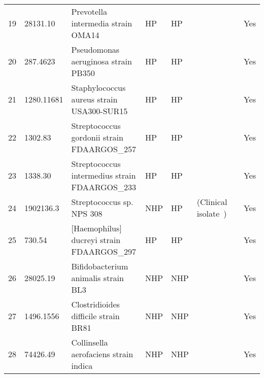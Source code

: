 \begin{tabular}{llllllll}
19  &    28131.10 &                                Prevotella intermedia strain OMA14 &            HP &              HP &                                      \cite{naito2016complete} &  \cite{santos2012differentially} &           Yes \\
20  &    287.4623 &                               Pseudomonas aeruginosa strain PB350 &            HP &              HP &                                    \cite{huang2020integrated} &         \cite{diggle2020microbe} &           Yes \\
21  &  1280.11681 &                         Staphylococcus aureus strain USA300-SUR15 &            HP &              HP &                                      \cite{sabat2017complete} &                 \cite{o2017into} &           Yes \\
22  &     1302.83 &                       Streptococcus gordonii strain FDAARGOS\_257 &            HP &              HP &                                                \cite{1302.83} &     \cite{park2020streptococcus} &           Yes \\
23  &     1338.30 &                    Streptococcus intermedius strain FDAARGOS\_233 &            HP &              HP &                                         \cite{issa2019genome} &            \cite{issa2019genome} &           Yes \\
24  &   1902136.3 &                                         Streptococcus sp. NPS 308 &           NHP &              HP &                   (Clinical isolate~\cite{kondo2016complete}) &         \cite{kondo2016complete} &           Yes \\
25  &      730.54 &                        [Haemophilus] ducreyi strain FDAARGOS\_297 &            HP &              HP &                                                 \cite{730.54} &                                  &           Yes \\
26  &    28025.19 &                               Bifidobacterium animalis strain BL3 &           NHP &             NHP &                        \cite{kang2017completeBifidobacterium} &                                  &           Yes \\
27  &   1496.1556 &                              Clostridioides difficile strain BR81 &           NHP &             NHP &                                              \cite{1496.1556} &   \cite{goudarzi2014clostridium} &           Yes \\
28  &    74426.49 &                             Collinsella aerofaciens strain indica &           NHP &             NHP &                                        \cite{bag2017complete} &    \cite{tourlousse2020complete} &           Yes \\

\end{tabular}
